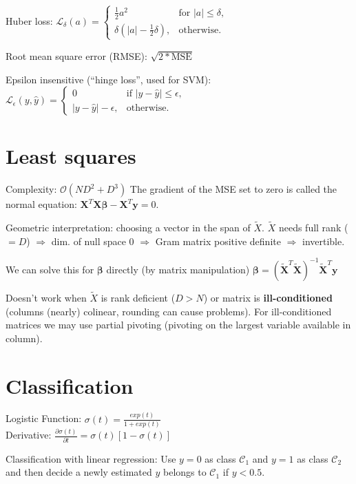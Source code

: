 \documentclass[10pt,a4paper,landscape]{article}
\renewcommand{\bf}[1]{\ensuremath{\mathbf{#1}}}
\newcommand{\bbeta}{\boldsymbol\beta}
\begin{document}
\begin{multicols*}{4}
Huber loss: $\mathcal{L}_\delta (a) = \begin{cases}
\frac{1}{2}{a^2}                   & \text{for } |a| \le \delta, \\
\delta (|a| - \frac{1}{2}\delta ), & \text{otherwise.}
\end{cases}$

Root mean square error (RMSE): $\sqrt{2 * \text{MSE}}$

Epsilon insensitive (``hinge loss'', used for SVM):
$\mathcal{L}_{\epsilon}(y, \hat{y}) = \begin{cases}
0                   & \text{if } |y - \hat y| \le \epsilon, \\
|y - \hat y| - \epsilon, & \text{otherwise.}
\end{cases}$

\section{Least squares}
Complexity: $\mathcal{O}(ND^2 + D^3)$
The gradient of the MSE set to zero is called the normal equation:
$  \bf{X}^T \bf{X} \bbeta - \bf{X}^T \bf{y} = 0$.

Geometric interpretation: choosing a vector in the span of $\tilde{X}$. $\tilde{X}$ needs full rank ($=D$) $\Rightarrow$ dim. of null space 0 $\Rightarrow$ Gram matrix positive definite $\Rightarrow$ invertible.

We can solve this for $\bbeta$ directly (by matrix manipulation)
$\bbeta = ( \bf{\tilde{X}}^T \bf{\tilde{X}} )^{-1} \bf{\tilde{X}}^T \bf{y}$

Doesn't work when $\tilde{X}$ is rank deficient ($D>N$) or matrix is \textbf{ill-conditioned} (columns (nearly) colinear, rounding can cause problems). For ill-conditioned matrices we may use partial pivoting (pivoting on the largest variable available in column).

\section{Classification}
Logistic Function: $\sigma(t) = \frac{exp(t)}{1+exp(t)}$\\
Derivative: $\frac{ \partial\sigma(t) }{ \partial t } = \sigma(t)[ 1 - \sigma(t) ]$

Classification with linear regression: Use $y = 0$ as class $\mathcal{C}_1$
and $y = 1$ as class $\mathcal{C}_2$ and then decide a newly estimated $y$ belongs
to $\mathcal{C}_1$ if $y < 0.5$.


\end{multicols*}
\end{document}
